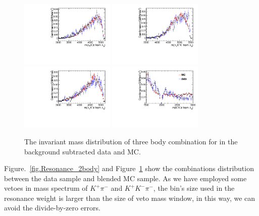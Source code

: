 \begin{figure}[bth]
\centering
\includegraphics[width=0.4\textwidth]{Figures/05_open_charm/04_tune/new_for_note/LcLbKmPi_M_con.pdf}%
\includegraphics[width=0.4\textwidth]{Figures/05_open_charm/04_tune/new_for_note/LcLbKpKm_M_con.pdf}\\%
\includegraphics[width=0.4\textwidth]{Figures/05_open_charm/04_tune/new_for_note/LcLbKpPi_M_con.pdf}%
\includegraphics[width=0.4\textwidth]{Figures/05_open_charm/04_tune/new_for_note/LbKpKmPi_M.pdf}\\%
\caption{The invariant mass distribution of  three body combination for \LbLckkpi in the background subtracted data and MC.}
\label{fig.Resonance_3body}
\end{figure}  


Figure.~\ref{fig.Resonance_2body} and Figure~\ref{fig.Resonance_3body} show the combinations distribution between the data sample and blended MC sample. 
As we have employed some vetoes in mass spectrum of $K^+\pi^-$ and $K^+K^-\pi^-$, 
the bin's size used in the resonance weight is larger than the size of veto mass window, 
in this way, we can avoid the divide-by-zero errors. 

